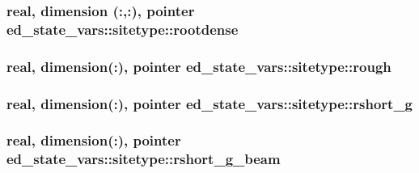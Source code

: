 \subsubsection[{\texorpdfstring{rootdense}{rootdense}}]{\setlength{\rightskip}{0pt plus 5cm}real, dimension (\+:,\+:), pointer ed\+\_\+state\+\_\+vars\+::sitetype\+::rootdense}\hypertarget{structed__state__vars_1_1sitetype_a7903aee63b08a2d05f8a8ba3528658bc}{}\label{structed__state__vars_1_1sitetype_a7903aee63b08a2d05f8a8ba3528658bc}
\subsubsection[{\texorpdfstring{rough}{rough}}]{\setlength{\rightskip}{0pt plus 5cm}real, dimension(\+:), pointer ed\+\_\+state\+\_\+vars\+::sitetype\+::rough}\hypertarget{structed__state__vars_1_1sitetype_a820d443eb59463ee3d2f8ec4dbc39912}{}\label{structed__state__vars_1_1sitetype_a820d443eb59463ee3d2f8ec4dbc39912}
\subsubsection[{\texorpdfstring{rshort\+\_\+g}{rshort_g}}]{\setlength{\rightskip}{0pt plus 5cm}real, dimension(\+:), pointer ed\+\_\+state\+\_\+vars\+::sitetype\+::rshort\+\_\+g}\hypertarget{structed__state__vars_1_1sitetype_a7fb4b90370805991e66b0a731ca74e05}{}\label{structed__state__vars_1_1sitetype_a7fb4b90370805991e66b0a731ca74e05}
\subsubsection[{\texorpdfstring{rshort\+\_\+g\+\_\+beam}{rshort_g_beam}}]{\setlength{\rightskip}{0pt plus 5cm}real, dimension(\+:), pointer ed\+\_\+state\+\_\+vars\+::sitetype\+::rshort\+\_\+g\+\_\+beam}\hypertarget{structed__state__vars_1_1sitetype_afe85ecc4fbe76fee6b56a3208c9ce02b}{}\label{structed__state__vars_1_1sitetype_afe85ecc4fbe76fee6b56a3208c9ce02b}
